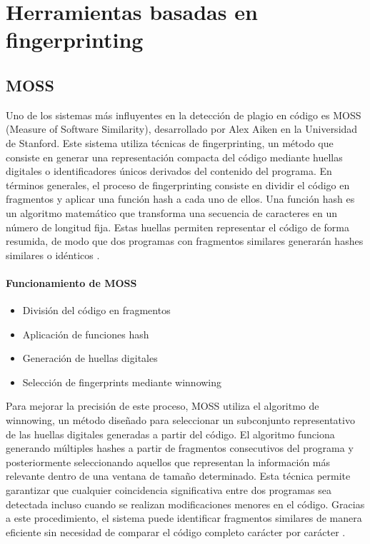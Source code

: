 \section{Herramientas basadas en fingerprinting}

\subsection{MOSS}

Uno de los sistemas más influyentes en la detección de plagio en código es MOSS (Measure of Software Similarity), desarrollado por Alex Aiken en la Universidad de Stanford. Este sistema utiliza técnicas de fingerprinting, un método que consiste en generar una representación compacta del código mediante huellas digitales o identificadores únicos derivados del contenido del programa. En términos generales, el proceso de fingerprinting consiste en dividir el código en fragmentos y aplicar una función hash a cada uno de ellos. Una función hash es un algoritmo matemático que transforma una secuencia de caracteres en un número de longitud fija. Estas huellas permiten representar el código de forma resumida, de modo que dos programas con fragmentos similares generarán hashes similares o idénticos \cite{AikenMOSS}.
\paragraph{Funcionamiento de MOSS}
\begin{itemize}
    \item División del código en fragmentos
    \item Aplicación de funciones hash
    \item Generación de huellas digitales
    \item Selección de fingerprints mediante winnowing
\end{itemize}

Para mejorar la precisión de este proceso, MOSS utiliza el algoritmo de winnowing, un método diseñado para seleccionar un subconjunto representativo de las huellas digitales generadas a partir del código. El algoritmo funciona generando múltiples hashes a partir de fragmentos consecutivos del programa y posteriormente seleccionando aquellos que representan la información más relevante dentro de una ventana de tamaño determinado. Esta técnica permite garantizar que cualquier coincidencia significativa entre dos programas sea detectada incluso cuando se realizan modificaciones menores en el código. Gracias a este procedimiento, el sistema puede identificar fragmentos similares de manera eficiente sin necesidad de comparar el código completo carácter por carácter \cite{AikenMOSS}.

